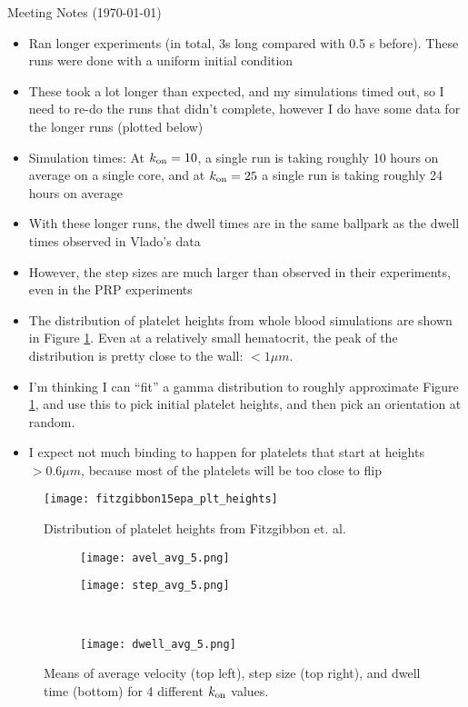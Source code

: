 \documentclass{article}
\newcommand{\tn}{\textnormal}
\begin{document}
\pagestyle{plain}

\begin{center}
  {\Large Meeting Notes (\today)}
\end{center}

\begin{itemize}
\item Ran longer experiments (in total, 3s long compared with 0.5 s
  before). These runs were done with a uniform initial condition
\item These took a lot longer than expected, and my simulations timed
  out, so I need to re-do the runs that didn't complete, however I do
  have some data for the longer runs (plotted below)
\item Simulation times: At $k_\tn{on} = 10$, a single run is taking roughly 10 hours on
  average on a single core, and at $k_\tn{on} = 25$ a single run is
  taking roughly 24 hours on average
\item With these longer runs, the dwell times are in the same ballpark
  as the dwell times observed in Vlado's data
\item However, the step sizes are much larger than observed in their
  experiments, even in the PRP experiments
\item The distribution of platelet heights from whole blood
  simulations are shown in Figure \ref{fig:plt-heights}. Even at a
  relatively small hematocrit, the peak of the distribution is pretty
  close to the wall: $< 1 \mu m$.
\item I'm thinking I can ``fit'' a gamma distribution to roughly
  approximate Figure \ref{fig:plt-heights}, and use this to pick
  initial platelet heights, and then pick an orientation at random.
\item I expect not much binding to happen for platelets that
  start at heights $> 0.6 \mu m$, because most of the platelets will
  be too close to flip
\end{itemize}

\begin{figure}[h]
  \centering
  \texttt{[image: fitzgibbon15epa\_plt\_heights]}
  \caption[Distribution of platelet heights]{Distribution of platelet
    heights from Fitzgibbon et. al.}
  \label{fig:plt-heights}
\end{figure}

\begin{figure}[h]
  \centering
  \begin{subfigure}{0.49\textwidth}
    \texttt{[image: avel\_avg\_5.png]}
  \end{subfigure}
  \hfill
  \begin{subfigure}{0.49\textwidth}
    \texttt{[image: step\_avg\_5.png]}
  \end{subfigure}
  \\
  \begin{subfigure}{0.49\textwidth}
    \texttt{[image: dwell\_avg\_5.png]}
  \end{subfigure}
  \label{fig:stats}
  \caption{Means of average velocity (top left), step size (top
    right), and dwell time (bottom) for 4 different $k_\tn{on}$
    values.}
\end{figure}

% 
% 
\end{document}

